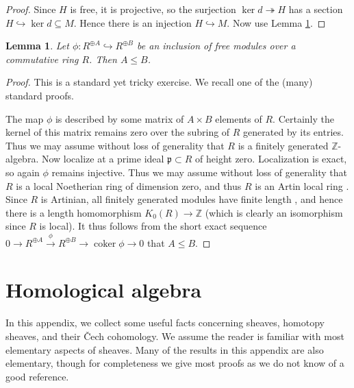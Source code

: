 \documentclass[12pt]{article}
\newtheorem{lemma}[theorem]{Lemma}
\theoremstyle{definition}
\theoremstyle{remark}
\numberwithin{equation}{subsection}
\newcommand{\ZZ}{\mathbb Z}
\newcommand{\coker}{\operatorname{coker}}
\begin{document}
\begin{proof}
Since $H$ is free, it is projective, so the surjection $\ker d\twoheadrightarrow H$ has a section $H\hookrightarrow\ker d\subseteq M$.  Hence there is an injection $H\hookrightarrow M$.  Now use Lemma \ref{freesubhassmallerrank}.
\end{proof}

\begin{lemma}\label{freesubhassmallerrank}
Let $\phi:R^{\oplus A}\hookrightarrow R^{\oplus B}$ be an inclusion of free modules over a commutative ring $R$.  Then $A\leq B$.
\end{lemma}

\begin{proof}
This is a standard yet tricky exercise.  We recall one of the (many) standard proofs.

The map $\phi$ is described by some matrix of $A\times B$ elements of $R$.  Certainly the kernel of this matrix remains zero over the subring of $R$ generated by its entries.  Thus we may assume without loss of generality that $R$ is a finitely generated $\ZZ$-algebra.  Now localize at a prime ideal $\mathfrak p\subset R$ of height zero.  Localization is exact, so again $\phi$ remains injective.  Thus we may assume without loss of generality that $R$ is a local Noetherian ring of dimension zero, and thus $R$ is an Artin local ring \cite[p90, Theorem 8.5]{atiyahmacdonald}.  Since $R$ is Artinian, all finitely generated modules have finite length \cite[pp76--77, Propositions 6.5 and 6.8]{atiyahmacdonald}, and hence there is a length homomorphism $K_0(R)\to\ZZ$ \cite[p77, Proposition 6.9]{atiyahmacdonald} (which is clearly an isomorphism since $R$ is local).  It thus follows from the short exact sequence $0\to R^{\oplus A}\xrightarrow\phi R^{\oplus B}\to\coker\phi\to 0$ that $A\leq B$.
\end{proof}

\appendix

\section{Homological algebra}\label{homologicalalgebrasection}

In this appendix, we collect some useful facts concerning sheaves, homotopy sheaves, and their \v Cech cohomology.  We assume the reader is familiar with most elementary aspects of sheaves.  Many of the results in this appendix are also elementary, though for completeness we give most proofs as we do not know of a good reference.
\end{document}
